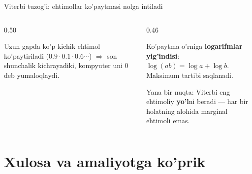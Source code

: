 \documentclass[aspectratio=169,11pt]{beamer}
\begin{document}
\begin{frame}{Viterbi tuzog'i: ehtimollar ko'paytmasi nolga intiladi}
  \begin{columns}[T]
    \begin{column}{0.50\textwidth}
      \begin{tcolorbox}[warnbox,title=Underflow]
        \small
        Uzun gapda ko'p kichik ehtimol ko'paytiriladi
        ($0.9\cdot 0.1\cdot 0.6\cdots$) $\Rightarrow$ son shunchalik kichrayadiki,
        kompyuter uni \textbf{$0$} deb yumaloqlaydi.
      \end{tcolorbox}
    \end{column}
    \begin{column}{0.46\textwidth}
      \begin{tcolorbox}[okbox,title=Yechim: log fazo,top=2pt,bottom=2pt]
        \small
        Ko'paytma o'rniga \textbf{logarifmlar yig'indisi}:
        $\log(ab)=\log a + \log b$. Maksimum tartibi saqlanadi.
      \end{tcolorbox}
      \vspace{3pt}
      \footnotesize\color{halfgray}
      Yana bir nuqta: Viterbi eng ehtimoliy \textbf{yo'l}ni beradi ---
      har bir holatning alohida marginal ehtimoli emas.
    \end{column}
  \end{columns}
\end{frame}

\section[Xulosa]{Xulosa va amaliyotga ko'prik}
\end{document}
